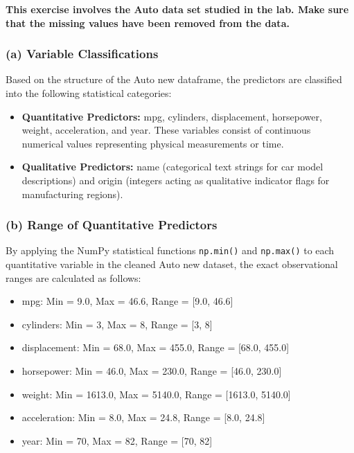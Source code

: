 \documentclass[12pt,a4paper]{article}
\begin{document}
\textbf{This exercise involves the Auto data set studied in the lab. Make sure that the missing values have been removed from the data.}

\subsubsection*{(a) Variable Classifications}

Based on the structure of the Auto new dataframe, the predictors are classified into the following statistical categories:

\begin{itemize}
    \item \textbf{Quantitative Predictors:} mpg, cylinders, displacement, horsepower, weight, acceleration, and year. These variables consist of continuous numerical values representing physical measurements or time.
    \item \textbf{Qualitative Predictors:} name (categorical text strings for car model descriptions) and origin (integers acting as qualitative indicator flags for manufacturing regions).
\end{itemize}

\subsubsection*{(b) Range of Quantitative Predictors}

By applying the NumPy statistical functions \texttt{np.min()} and \texttt{np.max()} to each quantitative variable in the cleaned Auto new dataset, the exact observational ranges are calculated as follows:

\begin{itemize}
    \item mpg: Min = 9.0, Max = 46.6, Range = [9.0, 46.6]
    \item cylinders: Min = 3, Max = 8, Range = [3, 8]
    \item displacement: Min = 68.0, Max = 455.0, Range = [68.0, 455.0]
    \item horsepower: Min = 46.0, Max = 230.0, Range = [46.0, 230.0]
    \item weight: Min = 1613.0, Max = 5140.0, Range = [1613.0, 5140.0]
    \item acceleration: Min = 8.0, Max = 24.8, Range = [8.0, 24.8]
    \item year: Min = 70, Max = 82, Range = [70, 82]
\end{itemize}
\end{document}
